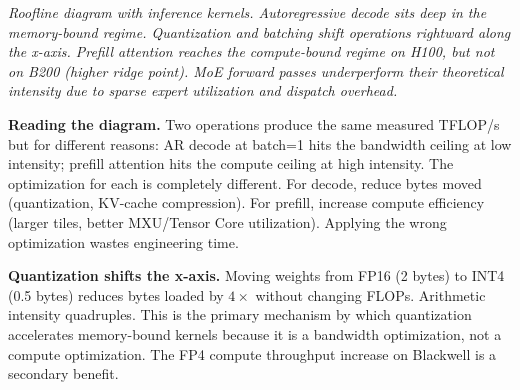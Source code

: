 \begin{center}
\end{center}

\smallskip
{\small\textit{Roofline diagram with inference kernels. Autoregressive decode sits deep in the memory-bound regime. Quantization and batching shift operations rightward along the x-axis. Prefill attention reaches the compute-bound regime on H100, but not on B200 (higher ridge point). MoE forward passes underperform their theoretical intensity due to sparse expert utilization and dispatch overhead.}}

\textbf{Reading the diagram.} Two operations produce the same measured TFLOP/s but for different reasons: AR decode at batch=1 hits the bandwidth ceiling at low intensity; prefill attention hits the compute ceiling at high intensity. The optimization for each is completely different. For decode, reduce bytes moved (quantization, KV-cache compression). For prefill, increase compute efficiency (larger tiles, better MXU/Tensor Core utilization). Applying the wrong optimization wastes engineering time.

\textbf{Quantization shifts the x-axis.} Moving weights from FP16 (2 bytes) to INT4 (0.5 bytes) reduces bytes loaded by $4\times$ without changing FLOPs. Arithmetic intensity quadruples. This is the primary mechanism by which quantization accelerates memory-bound kernels because it is a bandwidth optimization, not a compute optimization. The FP4 compute throughput increase on Blackwell is a secondary benefit.

